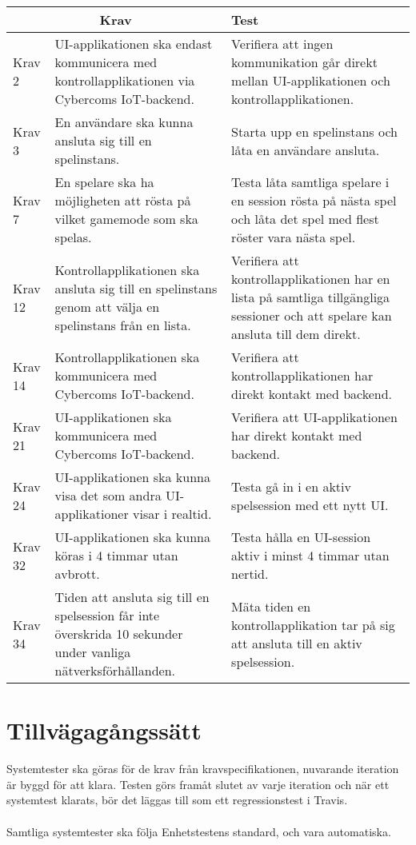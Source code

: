 \documentclass[10pt]{article}
\begin{document}
	\begin{tabular}{| p{1.5cm} | p{8cm} | p{8cm}|}
	
  \hline
    \multicolumn{2}{|c|}{Krav}&{Test}\\
    \hline
		Krav 2&UI-applikationen ska endast kommunicera med \newline kontrollapplikationen via Cybercoms IoT-backend.&Verifiera att ingen kommunikation går direkt mellan UI-applikationen och kontrollapplikationen.\\
		\hline
		Krav 3& En användare ska kunna ansluta sig till en spelinstans. &Starta upp en spelinstans och låta en användare ansluta. \\
		\hline
		Krav 7& En spelare ska ha möjligheten att rösta på vilket gamemode som ska spelas. & Testa låta samtliga spelare i en session rösta på nästa spel och låta det spel med flest röster vara nästa spel.\\
		\hline
		Krav 12& Kontrollapplikationen ska ansluta sig till en spelinstans genom att välja en spelinstans från en lista. & Verifiera att kontrollapplikationen har en lista på samtliga tillgängliga sessioner och att spelare kan ansluta till dem direkt. \\
		\hline
		Krav 14& Kontrollapplikationen ska kommunicera med Cybercoms IoT-backend. & Verifiera att kontrollapplikationen har direkt kontakt med backend. \\
		\hline
		Krav 21& UI-applikationen ska kommunicera med Cybercoms IoT-backend. & Verifiera att UI-applikationen har direkt kontakt med backend. \\
		\hline
		Krav 24& UI-applikationen ska kunna visa det som andra UI-applikationer visar i realtid. & Testa gå in i en aktiv spelsession med ett nytt UI. \\
		\hline
		Krav 32& UI-applikationen ska kunna köras i 4 timmar utan avbrott. & Testa hålla en UI-session aktiv i minst 4 timmar utan nertid. \\
		\hline
		Krav 34& Tiden att ansluta sig till en spelsession får inte överskrida 10 sekunder under vanliga nätverksförhållanden. & Mäta tiden en kontrollapplikation tar på sig att ansluta till en aktiv spelsession. \\
		\hline

   
  \end{tabular}
  
  

	
	


\section{Tillvägagångssätt}
	Systemtester ska göras för de krav från kravspecifikationen, nuvarande iteration är byggd för att klara. Testen görs framåt slutet av varje iteration och när ett systemtest klarats, bör det läggas till som ett regressionstest i Travis.\\
	\\
	Samtliga systemtester ska följa Enhetstestens standard, och vara automatiska. 		
	
\end{document}
